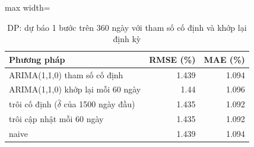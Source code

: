 \begin{table}[H]
\centering\footnotesize
\caption{DP: dự báo 1 bước trên 360 ngày với tham số cố định và khớp lại định kỳ}\label{tab:tab_b12_12_dp_rolling}
\begin{adjustbox}{max width=\linewidth}
\begin{tabular}{|>{\raggedright\arraybackslash}p{}|r|r|}
\toprule
Phương pháp & RMSE (\%) & MAE (\%) \\
\midrule
ARIMA(1,1,0) tham số cố định & 1.439 & 1.094 \\[3pt]
ARIMA(1,1,0) khớp lại mỗi 60 ngày & 1.44 & 1.096 \\[3pt]
trôi cố định ($\hat{\delta}$ của 1500 ngày đầu) & 1.435 & 1.092 \\[3pt]
trôi cập nhật mỗi 60 ngày & 1.435 & 1.092 \\[3pt]
naive & 1.439 & 1.094 \\[3pt]
\bottomrule
\end{tabular}
\end{adjustbox}
\end{table}
